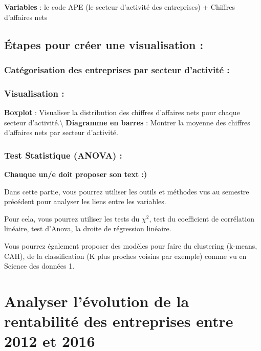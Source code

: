 \documentclass[mstat,12pt]{unswthesis}
\begin{document}
\bigskip

\textbf{Variables} : le code APE (le secteur d'activité des entreprises)
+ Chiffres d'affaires nets

\subsection{Étapes pour créer une visualisation
:}\label{uxe9tapes-pour-cruxe9er-une-visualisation-3}

\subsubsection{Catégorisation des entreprises par secteur d'activité
:}\label{catuxe9gorisation-des-entreprises-par-secteur-dactivituxe9}

\subsubsection{Visualisation :}\label{visualisation}

\textbf{Boxplot} : Visualiser la distribution des chiffres d'affaires
nets pour chaque secteur d'activité.\textbackslash{} \textbf{Diagramme
en barres} : Montrer la moyenne des chiffres d'affaires nets par secteur
d'activité.

\subsubsection{Test Statistique (ANOVA) :}\label{test-statistique-anova}

\textbf{Chauque un/e doit proposer son text :) }

Dans cette partie, vous pourrez utiliser les outils et méthodes vus au
semestre précédent pour analyser les liens entre les variables.

Pour cela, vous pourrez utiliser les tests du \(\chi^2\), test du
coefficient de corrélation linéaire, test d'Anova, la droite de
régression linéaire.

Vous pourrez également proposer des modèles pour faire du clustering
(k-means, CAH), de la classification (K plus proches voisins par
exemple) comme vu en Science des données 1.

\newpage

\section{\texorpdfstring{\textbf{Analyser l'évolution de la rentabilité
des entreprises entre 2012 et
2016}}{Analyser l'évolution de la rentabilité des entreprises entre 2012 et 2016}}\label{analyser-luxe9volution-de-la-rentabilituxe9-des-entreprises-entre-2012-et-2016}
\end{document}
